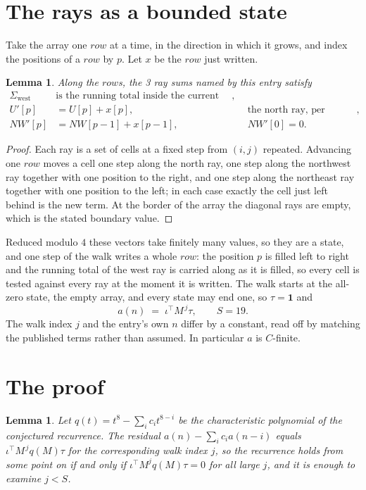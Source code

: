 \documentclass[11pt,a4paper]{article}
\theoremstyle{plain}
\newtheorem{lemma}[theorem]{Lemma}
\theoremstyle{definition}
\begin{document}
\section{The rays as a bounded state}

Take the array one $row$ at a time, in the direction in which it grows, and index the
positions of a $row $ by $p$. Let $x$ be the $row$ just written.

\begin{lemma}\label{lem:rays}
Along the $row$s, the 3 ray sums named by this entry satisfy
\[
\begin{aligned}
\Sigma_{\mathrm{west}}\ &\text{is the running total inside the current row},\\
U'[p]&=U[p]+x[p], &&\text{the north ray, per position},\\
NW'[p]&=NW[p-1]+x[p-1], && NW'[0]=0 .
\end{aligned}
\]
\end{lemma}

\begin{proof}
Each ray is a set of cells at a fixed step from $(i,j)$ repeated. Advancing one $row$
moves a cell one step along the north ray, one step along the northwest ray together with one
position to the right, and one step along the northeast ray together with one position to the
left; in each case exactly the cell just left behind is the new term. At the border of the
array the diagonal rays are empty, which is the stated boundary value.
\end{proof}

Reduced modulo $4$ these vectors take finitely many values, so they are a state, and one step
of the walk writes a whole $row$: the position $p$ is filled left to right and the
running total of the west ray is carried along as it is filled, so every cell is tested
against every ray at the moment it is written. The walk starts at the all-zero state, the empty
array, and every state may end one, so $\tau=\mathbf{1}$ and
\[
a(n)\;=\;\iota^{\!\top}M^{\,j}\tau ,\qquad S=19.
\]
The walk index $j$ and the entry's own $n$ differ by a constant, read off by matching the
published terms rather than assumed. In particular $a$ is $C$-finite.

\section{The proof}

\begin{lemma}\label{lem:crit}
Let $q(t)=t^{8}-\sum_i c_it^{8-i}$ be the characteristic polynomial of the
conjectured recurrence. The residual $a(n)-\sum_ic_ia(n-i)$ equals
$\iota^{\!\top}M^{\,j}q(M)\tau$ for the corresponding walk index $j$, so the recurrence
holds from some point on if and only if $\iota^{\!\top}M^{j}q(M)\tau=0$ for all large $j$,
and it is enough to examine $j<S$.
\end{lemma}
\end{document}
